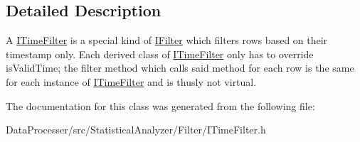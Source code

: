 \subsection{Detailed Description}
A \hyperlink{classITimeFilter}{I\+Time\+Filter} is a special kind of \hyperlink{classIFilter}{I\+Filter} which filters rows based on their timestamp only. Each derived class of \hyperlink{classITimeFilter}{I\+Time\+Filter} only has to override \textquotesingle{}is\+Valid\+Time\textquotesingle{}; the \textquotesingle{}filter\textquotesingle{} method which calls said method for each row is the same for each instance of \hyperlink{classITimeFilter}{I\+Time\+Filter} and is thusly not virtual. 

The documentation for this class was generated from the following file\+:\begin{DoxyCompactItemize}
\item 
Data\+Processer/src/\+Statistical\+Analyzer/\+Filter/I\+Time\+Filter.\+h\end{DoxyCompactItemize}
